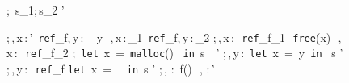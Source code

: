 \begin{figure}[H]
  \begin{minipage}{0.45\linewidth}
  \end{minipage}
  \begin{minipage}{0.45\linewidth}
    {\Theta;\,\Gamma\,\vdash\,s_{1};\,s_{2}\,\Rightarrow\,\Gamma'}
  \end{minipage}
    {\Theta;\,\Gamma,\,x\,:\,\tau'\ \texttt{ref}_{f},\,y\,:\,\tau \,\vdash\,
    \,\leftarrow\,y
    \,\Rightarrow\,\Gamma,\,x\,:\,\tau_{1}\ \texttt{ref}_{f},\,y\,:\,\tau_{2}}
    {\Theta;\,\Gamma,\,x\,:\,\tau\ \texttt{ref}_{f_{1}}\,
    \vdash\,\texttt{free}(x)\,
    \Rightarrow\,\Gamma,\,x\,:\,\tau\ \texttt{ref}_{f_{2}}}
    {\Theta;\,\Gamma\,\vdash\,\texttt{let}\ x\ =\ \texttt{malloc}()
    \ \texttt{in}\ s\, \Rightarrow \, \Gamma'}
    {\Theta;\,\Gamma,\,y\,:\,\tau\,\vdash\,\texttt{let}\ x\ =\ y\ \texttt{in}
    \ s\,\Rightarrow\,\Gamma'}
    {\Theta;\,\Gamma,\,y\,:\,\tau\ \texttt{ref}_{f}\,\vdash\,\texttt{let}\ x\ =
    \ \ \texttt{in}\ s\,\Rightarrow\,\Gamma'}
    {\Theta;\,\Gamma,\,\,:\,\tilde{\tau}\,\vdash\,f()\,
    \Rightarrow\,\Gamma,\,\,:\,\tilde{\tau}'}
  \end{figure}

